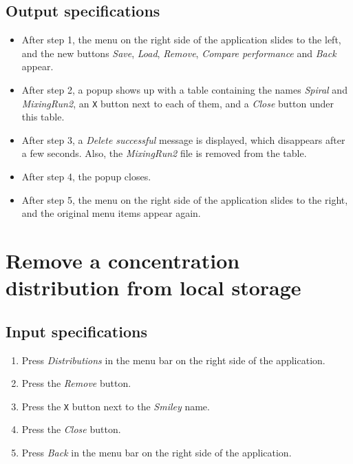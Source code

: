 \subsection*{Output specifications}
\begin{itemize}
\item After step 1, the menu on the right side of the application slides to the left, and the new buttons \emph{Save}, \emph{Load}, \emph{Remove}, \emph{Compare performance} and \emph{Back} appear.
\item After step 2, a popup shows up with a table containing the names \emph{Spiral} and \emph{MixingRun2}, an \texttt{X} button next to each of them, and a \emph{Close} button under this table.
\item After step 3, a \emph{Delete successful} message is displayed, which disappears after a few seconds. Also, the \emph{MixingRun2} file is removed from the table.
\item After step 4, the popup closes.
\item After step 5, the menu on the right side of the application slides to the right, and the original menu items appear again.
\end{itemize}

\section{Remove a concentration distribution from local storage}

\subsection*{Input specifications}
\begin{enumerate}
\item Press \emph{Distributions} in the menu bar on the right side of the application.
\item Press the \emph{Remove} button.
\item Press the \texttt{X} button next to the \emph{Smiley} name.
\item Press the \emph{Close} button.
\item Press \emph{Back} in the menu bar on the right side of the application.
\end{enumerate}


